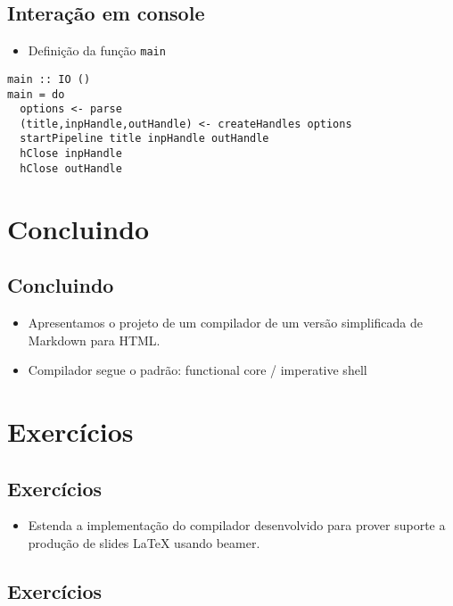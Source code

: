 \documentclass[11pt]{article}
\begin{document}
\subsection*{Interação em console}
\label{sec:org835d39d}

\begin{itemize}
\item Definição da função \texttt{main}
\end{itemize}

\begin{verbatim}
main :: IO ()
main = do
  options <- parse
  (title,inpHandle,outHandle) <- createHandles options
  startPipeline title inpHandle outHandle
  hClose inpHandle
  hClose outHandle
\end{verbatim}
\section*{Concluindo}
\label{sec:orge83d2c4}

\subsection*{Concluindo}
\label{sec:org40f2f85}

\begin{itemize}
\item Apresentamos o projeto de um compilador de um versão simplificada de Markdown para HTML.

\item Compilador segue o padrão: functional core / imperative shell
\end{itemize}
\section*{Exercícios}
\label{sec:org750f4eb}

\subsection*{Exercícios}
\label{sec:org89e41c2}

\begin{itemize}
\item Estenda a implementação do compilador desenvolvido para prover
suporte a produção de slides \LaTeX{} usando beamer.
\end{itemize}
\subsection*{Exercícios}
\label{sec:org9628204}
\end{document}
